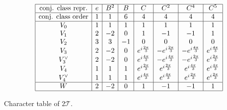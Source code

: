 \documentclass{worksheetclass}
\begin{document}
            \begin{table}[H]
                \centering
                {\small
                \begin{equation*}
                        \begin{array}{|c|c|c|c|c|c|c|c|}
                            \hline
                            \text{conj. class repr.} & e & B^2 & B & C & C^2 & C^4 & C^5 \\ \hline
                            \text{conj. class order} & 1 & 1 & 6 & 4 & 4 & 4 & 4\\
                            \hline
                            V_0 & 1 & 1 & 1 & 1 & 1 & 1 & 1 \\
                            V_1 & 2 & -2 & 0 & 1 & -1 & -1 & 1 \\
                            V_2 & 3 & 3 & -1 & 0 & 0 & 0 & 0 \\
                            V_3 & 2 & -2 & 0 & e^{i\frac{2\pi}{3}} & -e^{i\frac{2\pi}{3}} & -e^{i\frac{4\pi}{3}} & e^{i\frac{4\pi}{3}} \\
                            V_3^{\lor} & 2 & -2 & 0 & e^{i\frac{4\pi}{3}} & -e^{i\frac{4\pi}{3}} & -e^{i\frac{2\pi}{3}} & e^{i\frac{2\pi}{3}} \\
                            V_4 & 1 & 1 & 1 & e^{i\frac{2\pi}{3}} & e^{i\frac{2\pi}{3}} & e^{i\frac{4\pi}{3}} & e^{i\frac{4\pi}{3}} \\
                            V_4^{\lor} & 1 & 1 & 1 & e^{i\frac{4\pi}{3}} & e^{i\frac{4\pi}{3}} & e^{i\frac{2\pi}{3}} & e^{i\frac{2\pi}{3}} \\ \hline
                            W & 2 & -2 & 0 & 1 & -1 & -1 & 1 \\ \hline
                        \end{array}
                    \end{equation*}}
                \caption{Character table of $2\mathcal{T}$.}
            \end{table}
\end{document}
